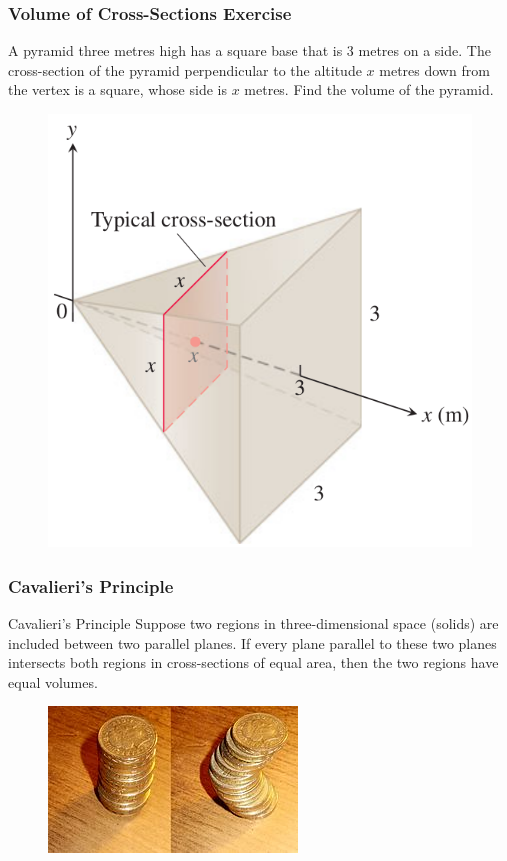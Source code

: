 \documentclass[xcolor=dvipsnames]{beamer}
\begin{document}
\begin{frame}
  \frametitle{Volume of Cross-Sections Exercise}
{\ubung} A pyramid three metres high has a square base that is 3
metres on a side. The cross-section of the pyramid perpendicular to
the altitude $x$ metres down from the vertex is a square, whose side is
$x$ metres. Find the volume of the pyramid.
\begin{figure}[h]
  \includegraphics[scale=0.3]{./diagrams/pyramidvol.png}
\end{figure}
\end{frame}

\begin{frame}
  \frametitle{Cavalieri's Principle}
  \begin{block}{Cavalieri's Principle}
    Suppose two regions in three-dimensional space (solids) are
    included between two parallel planes. If every plane parallel to
    these two planes intersects both regions in cross-sections of
    equal area, then the two regions have equal volumes.
  \end{block}
  \begin{figure}[h]
    \includegraphics[scale=2]{./diagrams/cavalieri.jpg}
  \end{figure}
\end{frame}
\end{document}
